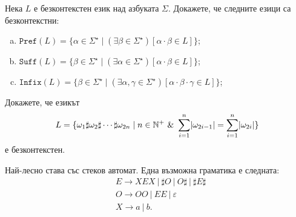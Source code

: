 \begin{problem}
  Нека $L$ е безконтекстен език над азбуката $\Sigma$.
  Докажете, че следните езици са безконтекстни:
  \begin{enumerate}[a)]
  \item 
    $\texttt{Pref}(L) = \{\alpha \in \Sigma^\star \mid (\exists \beta \in \Sigma^\star)[\alpha\cdot\beta \in L]\}$;
  \item 
    $\texttt{Suff}(L) = \{\beta \in \Sigma^\star \mid (\exists \alpha \in \Sigma^\star)[\alpha\cdot\beta \in L]\}$;
  \item
    $\texttt{Infix}(L) = \{\beta \in \Sigma^\star \mid (\exists \alpha,\gamma \in \Sigma^\star)[\alpha \cdot \beta \cdot \gamma \in L]\}$;
  \end{enumerate}
\end{problem}

\begin{problem}
  Докажете, че езикът
  \[L = \{\omega_1 \sharp \omega_2 \sharp \cdots \sharp \omega_{2n} \mid n\in\Nat^+\ \&\ \sum^n_{i=1}\abs{\omega_{2i-1}} = \sum^{n}_{i=1}\abs{\omega_{2i}}\}\]
  е безконтекстен.
\end{problem}
\begin{hint}
  Най-лесно става със стеков автомат.
  Една възможна граматика е следната:
  \begin{align*}
    & E \to XEX\ |\ \sharp O\ |\ O\sharp\ |\ \sharp E\sharp\\
    & O \to OO\ |\ EE\ |\ \varepsilon\\
    & X \to a\ |\ b.
  \end{align*}
\end{hint}

